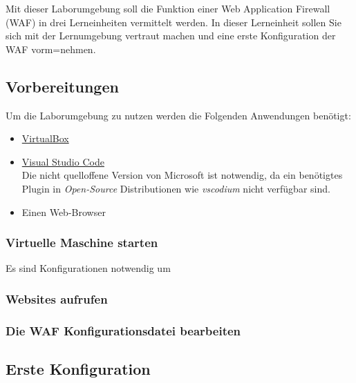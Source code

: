 Mit dieser Laborumgebung soll die Funktion einer Web Application Firewall (WAF) in drei Lerneinheiten vermittelt werden.
In dieser Lerneinheit sollen Sie sich mit der Lernumgebung vertraut machen und eine erste Konfiguration der WAF vorm=nehmen.

\subsection{Vorbereitungen}

Um die Laborumgebung zu nutzen werden die Folgenden Anwendungen benötigt:
\begin{itemize}
    \item \href{https://www.virtualbox.org/}{VirtualBox}
    \item \href{https://code.visualstudio.com/download}{Visual Studio Code}\\
    Die nicht quelloffene Version von Microsoft ist notwendig, da ein benötigtes Plugin in \textit{Open-Source} Distributionen wie \textit{vscodium} nicht verfügbar sind.
    \item Einen Web-Browser
\end{itemize}

\subsubsection{Virtuelle Maschine starten}
Es sind Konfigurationen notwendig um 

\subsubsection{Websites aufrufen}
\subsubsection{Die WAF Konfigurationsdatei bearbeiten}

\subsection{Erste Konfiguration}

\subsubsection{}
\subsubsection{}



\pagebreak